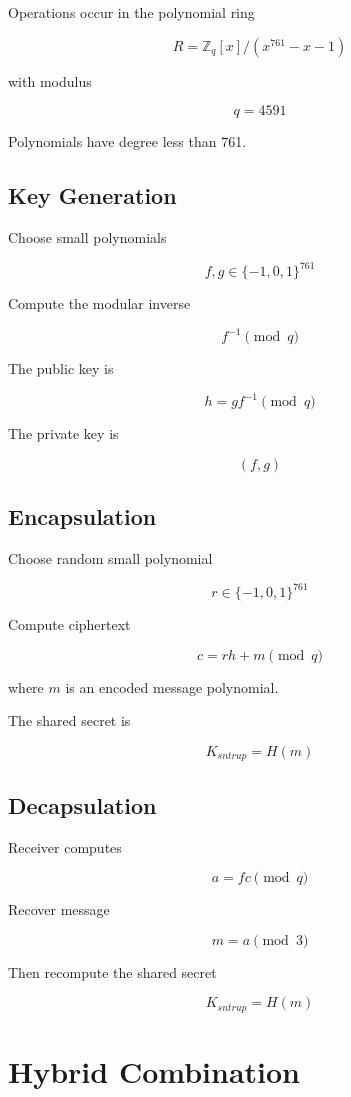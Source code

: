 \documentclass{article}
\begin{document}
Operations occur in the polynomial ring

\[
R = \mathbb{Z}_q[x] / (x^{761} - x - 1)
\]

with modulus

\[
q = 4591
\]

Polynomials have degree less than 761.

\subsection{Key Generation}

Choose small polynomials

\[
f, g \in \{-1,0,1\}^{761}
\]

Compute the modular inverse

\[
f^{-1} \pmod q
\]

The public key is

\[
h = g f^{-1} \pmod q
\]

The private key is

\[
(f,g)
\]

\subsection{Encapsulation}

Choose random small polynomial

\[
r \in \{-1,0,1\}^{761}
\]

Compute ciphertext

\[
c = r h + m \pmod q
\]

where \(m\) is an encoded message polynomial.

The shared secret is

\[
K_{sntrup} = H(m)
\]

\subsection{Decapsulation}

Receiver computes

\[
a = f c \pmod q
\]

Recover message

\[
m = a \pmod 3
\]

Then recompute the shared secret

\[
K_{sntrup} = H(m)
\]

\section{Hybrid Combination}
\end{document}
